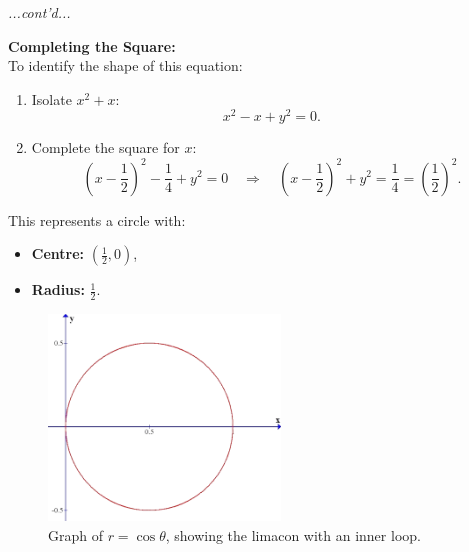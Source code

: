 \documentclass{article}
\begin{document}
\begin{exercisebox}
    \begin{solutionbox}
        \textit{...cont'd...}
        \begin{conceptbox}
            \textbf{Completing the Square:} \\
            To identify the shape of this equation:
            \begin{enumerate}
                \item Isolate \( x^2 + x \):
                \[
                x^2 - x + y^2 = 0.
                \]
                \item Complete the square for \( x \):
                \[
                \left(x - \frac{1}{2}\right)^2 - \frac{1}{4} + y^2 = 0 \quad \Rightarrow \quad \left(x - \frac{1}{2}\right)^2 + y^2 = \frac{1}{4} = \left(\frac{1}{2}\right)^2.
                \]
            \end{enumerate}
    
            This represents a circle with:
            \begin{itemize}
                \item \textbf{Centre:} \( \left(\frac{1}{2}, 0\right) \),
                \item \textbf{Radius:} \( \frac{1}{2} \).
            \end{itemize}
        \end{conceptbox}
    
        \begin{figure}[H]
            \centering
            \includegraphics[width=0.55\textwidth]{hw practice question limacon.png}
            \caption{Graph of \( r = \cos\theta \), showing the limacon with an inner loop.}
            \label{fig:sample_image}
        \end{figure}
    \end{solutionbox}
\end{exercisebox}
\end{document}
